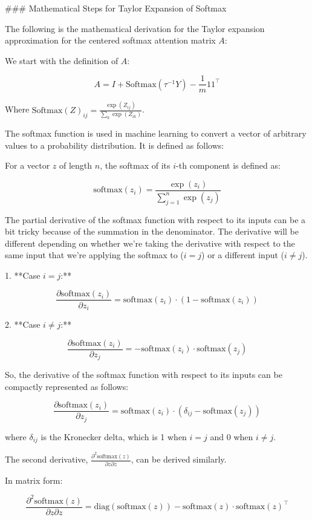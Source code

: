 ### Mathematical Steps for Taylor Expansion of Softmax

The following is the mathematical derivation for the Taylor expansion approximation for the centered softmax attention matrix \(A\):

We start with the definition of \(A\):

\[ A = I + \text{Softmax}(\tau^{-1}Y) - \frac{1}{m}11^\top \]

Where \(\text{Softmax}(Z)_{ij} = \frac{\exp(Z_{ij})}{\sum_k \exp(Z_{ik})}\).

The softmax function is used in machine learning to convert a vector of arbitrary values to a probability distribution. It is defined as follows:

For a vector \(z\) of length \(n\), the softmax of its \(i\)-th component is defined as:

\[ \text{softmax}(z_i) = \frac{\exp(z_i)}{\sum_{j=1}^{n} \exp(z_j)} \]

The partial derivative of the softmax function with respect to its inputs can be a bit tricky because of the summation in the denominator. The derivative will be different depending on whether we're taking the derivative with respect to the same input that we're applying the softmax to (\(i=j\)) or a different input (\(i \neq j\)).

1. **Case \(i = j\):**

\[ \frac{\partial \text{softmax}(z_i)}{\partial z_i} = \text{softmax}(z_i) \cdot (1 - \text{softmax}(z_i)) \]

2. **Case \(i \neq j\):**

\[ \frac{\partial \text{softmax}(z_i)}{\partial z_j} = - \text{softmax}(z_i) \cdot \text{softmax}(z_j) \]

So, the derivative of the softmax function with respect to its inputs can be compactly represented as follows:

\[ \frac{\partial \text{softmax}(z_i)}{\partial z_j} = \text{softmax}(z_i) \cdot (\delta_{ij} - \text{softmax}(z_j)) \]

where \(\delta_{ij}\) is the Kronecker delta, which is 1 when \(i=j\) and 0 when \(i \neq j\).

The second derivative, \(\frac{\partial^2 \text{softmax}(z)}{\partial z \partial z}\), can be derived similarly.

In matrix form:

\[ \frac{\partial^2 \text{softmax}(z)}{\partial z \partial z} = \text{diag}(\text{softmax}(z)) - \text{softmax}(z) \cdot \text{softmax}(z)^\top \]

